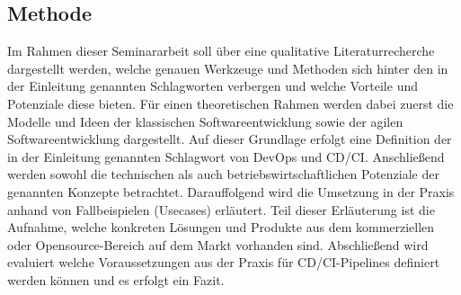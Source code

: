 \subsection{Methode}
\label{Methode}
Im Rahmen dieser Seminararbeit soll über eine qualitative Literaturrecherche dargestellt werden, welche genauen Werkzeuge und Methoden sich hinter den in der Einleitung genannten Schlagworten verbergen und welche Vorteile und Potenziale diese bieten.
Für einen theoretischen Rahmen werden dabei zuerst die Modelle und Ideen der klassischen Softwareentwicklung sowie der agilen Softwareentwicklung dargestellt. Auf dieser Grundlage erfolgt eine Definition der in der Einleitung genannten Schlagwort von \acrshort{DevOps} und \acrshort{CD}/\acrshort{CI}.
Anschließend werden sowohl die technischen als auch betriebswirtschaftlichen Potenziale der genannten Konzepte betrachtet. Darauffolgend wird die Umsetzung in der Praxis anhand von Fallbeispielen (Usecases) erläutert. Teil dieser Erläuterung ist die Aufnahme, welche konkreten Lösungen und Produkte aus dem kommerziellen oder Opensource-Bereich  auf dem Markt vorhanden sind.
Abschließend wird evaluiert welche Voraussetzungen aus der Praxis  für \acrshort{CD}/\acrshort{CI}-Pipelines definiert werden können und es erfolgt ein Fazit.

